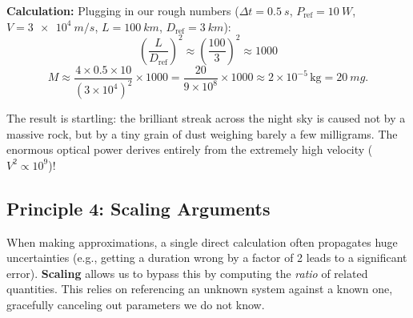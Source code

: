{\medskip
\textbf{Calculation:}
Plugging in our rough numbers ($\Delta t = \SI{0.5}{s}$, $P_\text{ref} = \SI{10}{W}$, $V = \SI{3e4}{m/s}$, $L = \SI{100}{km}$, $D_\text{ref} = \SI{3}{km}$):
\[
    \left(\frac{L}{D_\text{ref}}\right)^2 \approx \left(\frac{100}{3}\right)^2 \approx 1000
\]
\[
    M \approx \frac{4 \times 0.5 \times 10}{(3 \times 10^4)^2} \times 1000 = \frac{20}{9 \times 10^8} \times 1000 \approx 2 \times 10^{-5}\,\text{kg} = \SI{20}{mg}.
\]
\begin{remark}
The result is startling: the brilliant streak across the night sky is caused not by a massive rock, but by a tiny grain of dust weighing barely a few milligrams. The enormous optical power derives entirely from the extremely high velocity ($V^2 \propto 10^9$)!
\end{remark}}

\subsection{Principle 4: Scaling Arguments}

When making approximations, a single direct calculation often propagates huge uncertainties (e.g., getting a duration wrong by a factor of 2 leads to a significant error). \textbf{Scaling} allows us to bypass this by computing the \emph{ratio} of related quantities. This relies on referencing an unknown system against a known one, gracefully canceling out parameters we do not know.

